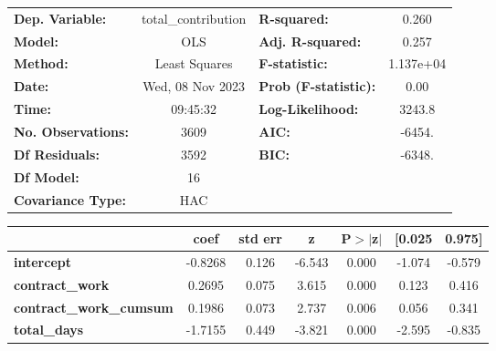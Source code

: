 \begin{center}
\begin{tabular}{lclc}
\toprule
\textbf{Dep. Variable:}                  & total\_contribution & \textbf{  R-squared:         } &     0.260   \\
\textbf{Model:}                          &         OLS         & \textbf{  Adj. R-squared:    } &     0.257   \\
\textbf{Method:}                         &    Least Squares    & \textbf{  F-statistic:       } & 1.137e+04   \\
\textbf{Date:}                           &   Wed, 08 Nov 2023  & \textbf{  Prob (F-statistic):} &     0.00    \\
\textbf{Time:}                           &       09:45:32      & \textbf{  Log-Likelihood:    } &    3243.8   \\
\textbf{No. Observations:}               &          3609       & \textbf{  AIC:               } &    -6454.   \\
\textbf{Df Residuals:}                   &          3592       & \textbf{  BIC:               } &    -6348.   \\
\textbf{Df Model:}                       &            16       & \textbf{                     } &             \\
\textbf{Covariance Type:}                &         HAC         & \textbf{                     } &             \\
\bottomrule
\end{tabular}
\begin{tabular}{lcccccc}
                                         & \textbf{coef} & \textbf{std err} & \textbf{z} & \textbf{P$> |$z$|$} & \textbf{[0.025} & \textbf{0.975]}  \\
\midrule
\textbf{intercept}                       &      -0.8268  &        0.126     &    -6.543  &         0.000        &       -1.074    &       -0.579     \\
\textbf{contract\_work}                  &       0.2695  &        0.075     &     3.615  &         0.000        &        0.123    &        0.416     \\
\textbf{contract\_work\_cumsum}          &       0.1986  &        0.073     &     2.737  &         0.006        &        0.056    &        0.341     \\
\textbf{total\_days}                     &      -1.7155  &        0.449     &    -3.821  &         0.000        &       -2.595    &       -0.835     \\

\end{tabular}
\end{center}
